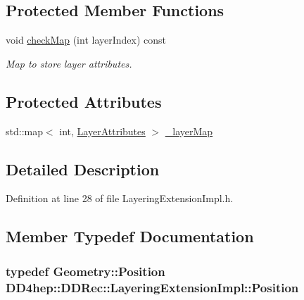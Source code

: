 \subsection*{Protected Member Functions}
\begin{DoxyCompactItemize}
\item 
void \hyperlink{class_d_d4hep_1_1_d_d_rec_1_1_layering_extension_impl_ad948f77c1b4415d85c86a116d4f8ab62}{checkMap} (int layerIndex) const 
\begin{DoxyCompactList}\small\item\em Map to store layer attributes. \item\end{DoxyCompactList}\end{DoxyCompactItemize}
\subsection*{Protected Attributes}
\begin{DoxyCompactItemize}
\item 
std::map$<$ int, \hyperlink{struct_d_d4hep_1_1_d_d_rec_1_1_layering_extension_impl_1_1_layer_attributes}{LayerAttributes} $>$ \hyperlink{class_d_d4hep_1_1_d_d_rec_1_1_layering_extension_impl_a59400bb78b40886a131cb8b085df125b}{\_\-layerMap}
\end{DoxyCompactItemize}


\subsection{Detailed Description}


Definition at line 28 of file LayeringExtensionImpl.h.

\subsection{Member Typedef Documentation}
\hypertarget{class_d_d4hep_1_1_d_d_rec_1_1_layering_extension_impl_a34281f7585bbe0d61654c9924e2789e3}{
\subsubsection[{Position}]{\setlength{\rightskip}{0pt plus 5cm}typedef {\bf Geometry::Position} {\bf DD4hep::DDRec::LayeringExtensionImpl::Position}}}
\label{class_d_d4hep_1_1_d_d_rec_1_1_layering_extension_impl_a34281f7585bbe0d61654c9924e2789e3}


